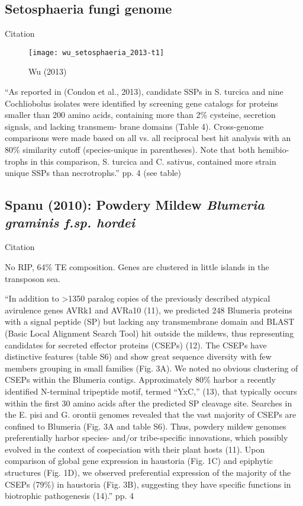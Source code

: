   \FloatBarrier

\subsection{Setosphaeria fungi genome}

  Citation \cite{wu_setosphaeria_2013}

  \begin{figure}[!hbpt] \centering
    \texttt{[image: wu\_setosphaeria\_2013-t1]}
    \caption{Wu (2013) \cite{wu_setosphaeria_2013}}
  \end{figure}

  ``As reported in (Condon et al., 2013), candidate SSPs in S. turcica and
  nine Cochliobolus isolates were identified by screening gene catalogs for
  proteins smaller than 200 amino acids, containing more than 2\% cysteine,
  secretion signals, and lacking transmem- brane domains (Table 4).
  Cross-genome comparisons were made based on all vs. all reciprocal best hit
  analysis with an 80\% similarity cutoff (species-unique in parentheses).
  Note that both hemibio- trophs in this comparison, S. turcica and C.
  sativus, contained more strain unique SSPs than necrotrophs.'' pp. 4 (see
  table)

  \FloatBarrier
\subsection{Spanu (2010): Powdery Mildew \textit{ Blumeria graminis f.sp. hordei}}

  Citation \cite{spanu_genome_2010}

  No RIP, 64\% TE composition. Genes are clustered in little islands in the transposon sea.


  ``In addition to >1350 paralog copies of the previously described atypical
  avirulence genes AVRk1 and AVRa10 (11), we predicted 248 Blumeria proteins with
  a signal peptide (SP) but lacking any transmembrane domain and BLAST (Basic
  Local Alignment Search Tool) hit outside the mildews, thus representing
  candidates for secreted effector proteins (CSEPs) (12). The CSEPs have
  distinctive features (table S6) and show great sequence diversity with few
  members grouping in small families (Fig. 3A). We noted no obvious clustering of
  CSEPs within the Blumeria contigs. Approximately 80\% harbor a recently
  identified N-terminal tripeptide motif, termed “YxC,” (13), that typically
  occurs within the first 30 amino acids after the predicted SP cleavage site.
  Searches in the E. pisi and G. orontii genomes revealed that the vast majority
  of CSEPs are confined to Blumeria (Fig. 3A and table S6).  Thus, powdery mildew
  genomes preferentially harbor species- and/or tribe-specific innovations, which
  possibly evolved in the context of cospeciation with their plant hosts (11).
  Upon comparison of global gene expression in haustoria (Fig. 1C) and epiphytic
  structures (Fig. 1D), we observed preferential expression of the majority of
  the CSEPs (79\%) in haustoria (Fig. 3B), suggesting they have specific
  functions in biotrophic pathogenesis (14).'' pp. 4

